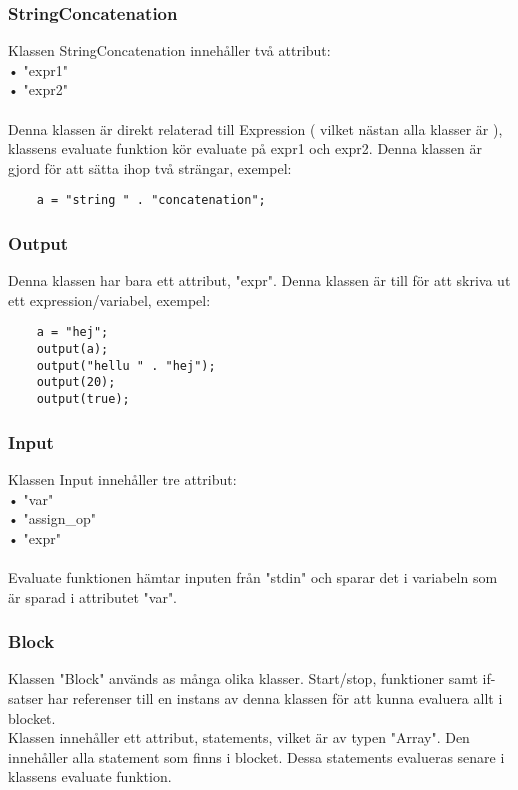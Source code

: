 \documentclass{TDP003mall}
\begin{document}
\subsubsection{StringConcatenation}
Klassen StringConcatenation innehåller två attribut: \\
 • "expr1"\\
 • "expr2"\\
\\
Denna klassen är direkt relaterad till Expression ( vilket nästan alla klasser är ), klassens evaluate funktion kör evaluate på expr1 och expr2. Denna klassen är gjord för att sätta ihop två strängar, exempel:\\
\begin{lstlisting}
    a = "string " . "concatenation";
\end{lstlisting}

\subsubsection{Output}
Denna klassen har bara ett attribut, "expr". Denna klassen är till för att skriva ut ett expression/variabel, exempel:
\begin{lstlisting}
    a = "hej";
    output(a);
    output("hellu " . "hej");
    output(20);
    output(true);
\end{lstlisting}

\subsubsection{Input}
Klassen Input innehåller tre attribut: \\
 • "var"\\
 • "assign\_op"\\
 • "expr"\\
\\
Evaluate funktionen hämtar inputen från "stdin" och sparar det i variabeln som är sparad i attributet "var".

\subsubsection{Block}
Klassen "Block" används as många olika klasser. Start/stop, funktioner samt if-satser har referenser till en instans av denna klassen för att kunna evaluera allt i blocket.\\
Klassen innehåller ett attribut, statements, vilket är av typen "Array". Den innehåller alla statement som finns i blocket. Dessa statements evalueras senare i klassens evaluate funktion.
\end{document}
